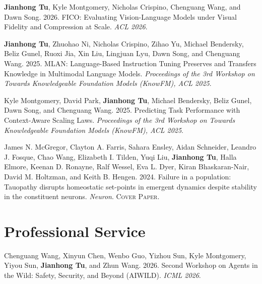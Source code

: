 \documentclass[10pt, letterpaper]{article}
\begin{document}
\begin{enumerate}[leftmargin=1.5em, label={[\arabic*]}, itemsep=0.45em]
        \item \textbf{Jianhong Tu}, Kyle Montgomery, Nicholas Crispino, Chenguang Wang, and Dawn Song. 2026. FICO: Evaluating Vision-Language Models under Visual Fidelity and Compression at Scale. \textit{ACL 2026}.
    
        \item \textbf{Jianhong Tu}, Zhuohao Ni, Nicholas Crispino, Zihao Yu, Michael Bendersky, Beliz Gunel, Ruoxi Jia, Xin Liu, Lingjuan Lyu, Dawn Song, and Chenguang Wang. 2025. MLAN: Language-Based Instruction Tuning Preserves and Transfers Knowledge in Multimodal Language Models. \textit{Proceedings of the 3rd Workshop on Towards Knowledgeable Foundation Models (KnowFM), ACL 2025}.

        \item Kyle Montgomery, David Park, \textbf{Jianhong Tu}, Michael Bendersky, Beliz Gunel, Dawn Song, and Chenguang Wang. 2025. Predicting Task Performance with Context-Aware Scaling Laws. \textit{Proceedings of the 3rd Workshop on Towards Knowledgeable Foundation Models (KnowFM), ACL 2025}.

        \item James N. McGregor, Clayton A. Farris, Sahara Ensley, Aidan Schneider, Leandro J. Fosque, Chao Wang, Elizabeth I. Tilden, Yuqi Liu, \textbf{Jianhong Tu}, Halla Elmore, Keenan D. Ronayne, Ralf Wessel, Eva L. Dyer, Kiran Bhaskaran-Nair, David M. Holtzman, and Keith B. Hengen. 2024. Failure in a population: Tauopathy disrupts homeostatic set-points in emergent dynamics despite stability in the constituent neurons. \textit{Neuron}. \textsc{Cover Paper}.
    
    \end{enumerate}


    \section{Professional Service}

    \begin{enumerate}[leftmargin=1.5em, label={[\arabic*]}, itemsep=0.45em]

        \item Chenguang Wang, Xinyun Chen, Wenbo Guo, Yizhou Sun, Kyle Montgomery, Yiyou Sun, \textbf{Jianhong Tu}, and Zhun Wang. 2026. Second Workshop on Agents in the Wild: Safety, Security, and Beyond (AIWILD). \textit{ICML 2026}.

    \end{enumerate}
\end{document}
